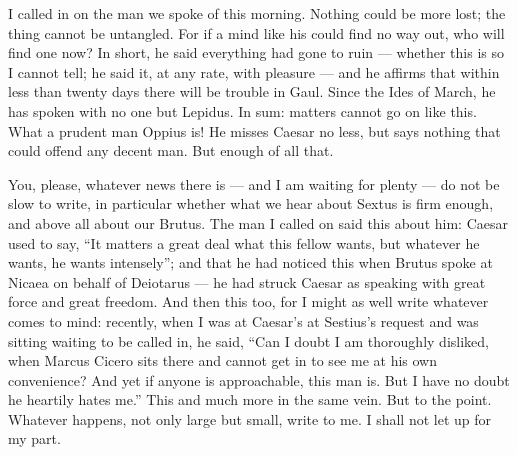 

 I called in on the man we spoke of this morning. Nothing could be more lost; the thing cannot be untangled. For if a mind like his could find no way out, who will find one now? In short, he said everything had gone to ruin --- whether this is so I cannot tell; he said it, at any rate, with pleasure --- and he affirms that within less than twenty days there will be trouble in Gaul. Since the Ides of March, he has spoken with no one but Lepidus. In sum: matters cannot go on like this. What a prudent man Oppius is! He misses Caesar no less, but says nothing that could offend any decent man. But enough of all that.

 You, please, whatever news there is --- and I am waiting for plenty --- do not be slow to write, in particular whether what we hear about Sextus is firm enough, and above all about our Brutus. The man I called on said this about him: Caesar used to say, ``It matters a great deal what this fellow wants, but whatever he wants, he wants intensely''; and that he had noticed this when Brutus spoke at Nicaea on behalf of Deiotarus --- he had struck Caesar as speaking with great force and great freedom. And then this too, for I might as well write whatever comes to mind: recently, when I was at Caesar's at Sestius's request and was sitting waiting to be called in, he said, ``Can I doubt I am thoroughly disliked, when Marcus Cicero sits there and cannot get in to see me at his own convenience? And yet if anyone is approachable, this man is. But I have no doubt he heartily hates me.'' This and much more in the same vein. But to the point. Whatever happens, not only large but small, write to me. I shall not let up for my part.
